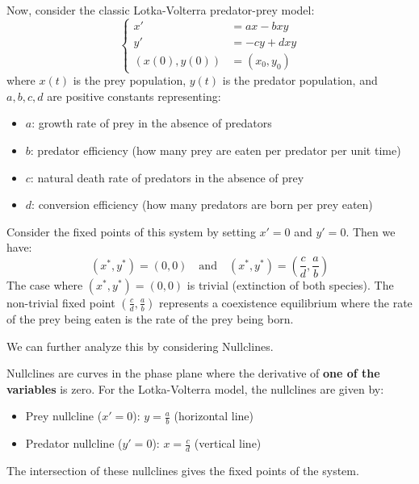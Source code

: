 \documentclass[11pt]{article}
\begin{document}
\begin{example}
    Now, consider the classic Lotka-Volterra predator-prey model:
    $$
    \begin{cases}
    x' &= ax - bxy \\
    y' &= -cy + dxy \\
    (x(0), y(0)) &= (x_0, y_0)
    \end{cases}
    $$
    where \( x(t) \) is the prey population, \( y(t) \) is the predator population, and \( a, b, c, d \) are positive constants representing:
    \begin{itemize}
        \item \( a \): growth rate of prey in the absence of predators
        \item \( b \): predator efficiency (how many prey are eaten per predator per unit time)
        \item \( c \): natural death rate of predators in the absence of prey
        \item \( d \): conversion efficiency (how many predators are born per prey eaten)
    \end{itemize}
    Consider the fixed points of this system by setting \( x' = 0 \) and \( y' = 0 \). Then we have:
    $$
    (x^*, y^*) = (0, 0) \quad \text{and} \quad (x^*, y^*) = \left(\frac{c}{d}, \frac{a}{b}\right)
    $$
    The case where \( (x^*, y^*) = (0, 0) \) is trivial (extinction of both species). The non-trivial fixed point \( \left(\frac{c}{d}, \frac{a}{b}\right) \) represents a coexistence equilibrium where the rate of the prey being eaten is the rate of the prey being born.
\end{example}

We can further analyze this by considering Nullclines.

\begin{definition}[Nullclines]
    Nullclines are curves in the phase plane where the derivative of \textbf{one of the variables} is zero. For the Lotka-Volterra model, the nullclines are given by:
    \begin{itemize}
        \item Prey nullcline (\( x' = 0 \)): \( y = \frac{a}{b} \) (horizontal line)
        \item Predator nullcline (\( y' = 0 \)): \( x = \frac{c}{d} \) (vertical line)
    \end{itemize}
    The intersection of these nullclines gives the fixed points of the system.
    
\end{definition}
\end{document}
